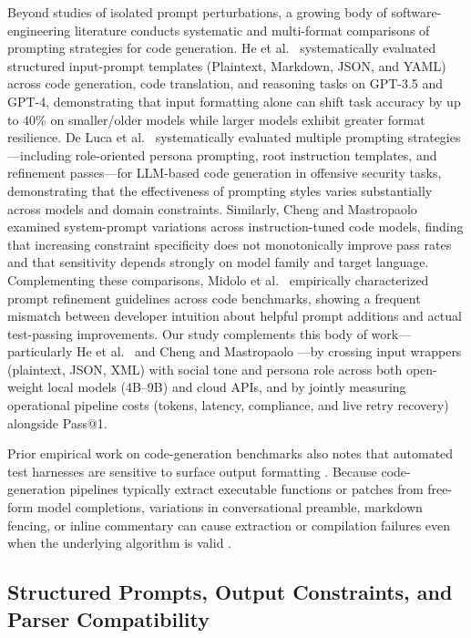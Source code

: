 \documentclass[a4paper,fleqn]{cas-sc}
\begin{document}
Beyond studies of isolated prompt perturbations, a growing body of software-engineering literature conducts systematic and multi-format comparisons of prompting strategies for code generation. He et al.\ \citep{he2024formatting} systematically evaluated structured input-prompt templates (Plaintext, Markdown, JSON, and YAML) across code generation, code translation, and reasoning tasks on GPT-3.5 and GPT-4, demonstrating that input formatting alone can shift task accuracy by up to $40\%$ on smaller/older models while larger models exhibit greater format resilience. De Luca et al.\ \citep{deluca2026evaluating} systematically evaluated multiple prompting strategies—including role-oriented persona prompting, root instruction templates, and refinement passes—for LLM-based code generation in offensive security tasks, demonstrating that the effectiveness of prompting styles varies substantially across models and domain constraints. Similarly, Cheng and Mastropaolo \citep{cheng2026systemprompts} examined system-prompt variations across instruction-tuned code models, finding that increasing constraint specificity does not monotonically improve pass rates and that sensitivity depends strongly on model family and target language. Complementing these comparisons, Midolo et al.\ \citep{midolo2026guidelines} empirically characterized prompt refinement guidelines across code benchmarks, showing a frequent mismatch between developer intuition about helpful prompt additions and actual test-passing improvements. Our study complements this body of work—particularly He et al.\ \citep{he2024formatting} and Cheng and Mastropaolo \citep{cheng2026systemprompts}—by crossing input wrappers (plaintext, JSON, XML) with social tone and persona role across both open-weight local models (4B--9B) and cloud APIs, and by jointly measuring operational pipeline costs (tokens, latency, compliance, and live retry recovery) alongside Pass@1.

Prior empirical work on code-generation benchmarks also notes that automated test harnesses are sensitive to surface output formatting \citep{chen2021codex, zhuo2024prosa}. Because code-generation pipelines typically extract executable functions or patches from free-form model completions, variations in conversational preamble, markdown fencing, or inline commentary can cause extraction or compilation failures even when the underlying algorithm is valid \citep{liu2024structuredoutput, zhou2023ifeval}.

\subsection{Structured Prompts, Output Constraints, and Parser
Compatibility}\label{structured-prompts-output-constraints-and-parser-compatibility}
\end{document}
